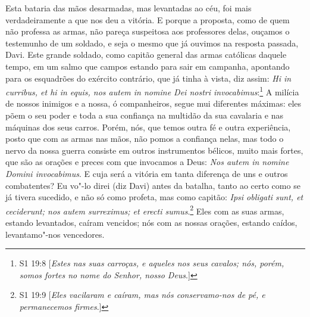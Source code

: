 Esta bataria das mãos desarmadas, mas levantadas ao céu, foi mais
verdadeiramente a que nos deu a vitória. E porque a proposta, como de
quem não professa as armas, não pareça suspeitosa aos professores delas,
ouçamos o testemunho de um soldado, e seja o mesmo que já ouvimos na
resposta passada, Davi. Este grande soldado, como capitão general das
armas católicas daquele tempo, em um salmo que campos estando para sair
em campanha, apontando para os esquadrões do exército contrário, que já
tinha à vista, diz assim: \emph{Hi in curribus, et hi in equis, nos autem in
nomine Dei nostri invocabimus}:\footnote{S1 19:8 [\textit{Estes nas suas carroças, e aqueles nos seus cavalos; nós, porém, somos fortes no nome do Senhor, nosso Deus}.]} A milícia de nossos inimigos e a
nossa, ó companheiros, segue mui diferentes máximas: eles põem o seu
poder e toda a sua confiança na multidão da sua cavalaria e nas máquinas
dos seus carros. Porém, nós, que temos outra fé e outra experiência,
posto que com as armas nas mãos, não pomos a confiança nelas, mas todo o
nervo da nossa guerra consiste em outros instrumentos bélicos, muito
mais fortes, que são as orações e preces com que invocamos a Deus: \emph{Nos
autem in nomine Domini invocabimus}. E cuja será a vitória em tanta
diferença de uns e outros combatentes? Eu vo"-lo direi (diz Davi) antes
da batalha, tanto ao certo como se já tivera sucedido, e não só como
profeta, mas como capitão: \emph{Ipsi obligati sunt, et ceciderunt; nos autem
surreximus; et erecti sumus}.\footnote{S1 19:9 [\textit{Eles vacilaram e caíram, mas nós conservamo-nos de pé, e permanecemos firmes}.]} Eles com as suas armas, estando
levantados, caíram vencidos; nós com as nossas orações, estando caídos,
levantamo"-nos vencedores.

